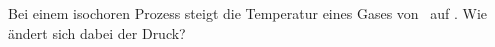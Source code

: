 Bei einem isochoren Prozess steigt die Temperatur eines Gases von \thAO\ auf \thBO. Wie ändert sich dabei der Druck?
